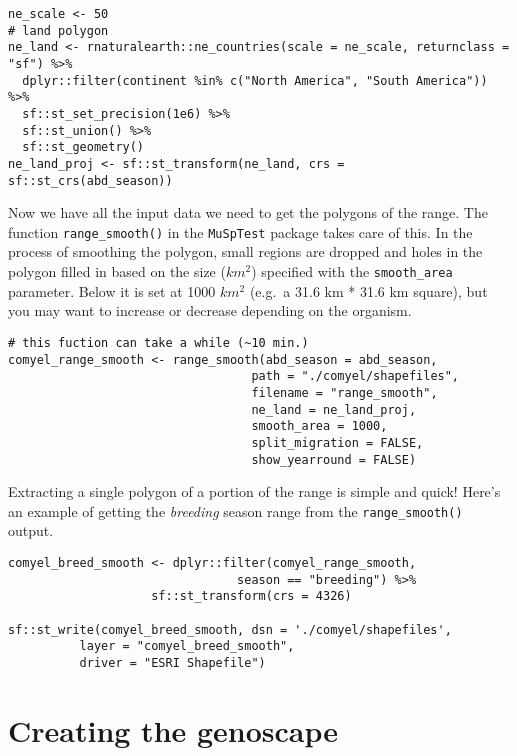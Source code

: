 \documentclass[
]{book}
\begin{document}
\begin{verbatim}
ne_scale <- 50
# land polygon
ne_land <- rnaturalearth::ne_countries(scale = ne_scale, returnclass = "sf") %>%
  dplyr::filter(continent %in% c("North America", "South America")) %>%
  sf::st_set_precision(1e6) %>%
  sf::st_union() %>% 
  sf::st_geometry()
ne_land_proj <- sf::st_transform(ne_land, crs = sf::st_crs(abd_season))
\end{verbatim}

Now we have all the input data we need to get the polygons of the range. The function \texttt{range\_smooth()} in the \texttt{MuSpTest} package takes care of this. In the process of smoothing the polygon, small regions are dropped and holes in the polygon filled in based on the size (\(km^2\)) specified with the \texttt{smooth\_area} parameter. Below it is set at 1000 \(km^2\) (e.g.~a 31.6 km * 31.6 km square), but you may want to increase or decrease depending on the organism.

\begin{verbatim}
# this fuction can take a while (~10 min.)
comyel_range_smooth <- range_smooth(abd_season = abd_season, 
                                  path = "./comyel/shapefiles", 
                                  filename = "range_smooth",
                                  ne_land = ne_land_proj,
                                  smooth_area = 1000,
                                  split_migration = FALSE, 
                                  show_yearround = FALSE)
\end{verbatim}

Extracting a single polygon of a portion of the range is simple and quick! Here's an example of getting the \emph{breeding} season range from the \texttt{range\_smooth()} output.

\begin{verbatim}
comyel_breed_smooth <- dplyr::filter(comyel_range_smooth,
                                season == "breeding") %>%
                    sf::st_transform(crs = 4326)

sf::st_write(comyel_breed_smooth, dsn = './comyel/shapefiles',
          layer = "comyel_breed_smooth",
          driver = "ESRI Shapefile")
\end{verbatim}

\hypertarget{creating-the-genoscape}{%
\section{Creating the genoscape}\label{creating-the-genoscape}}
\end{document}
